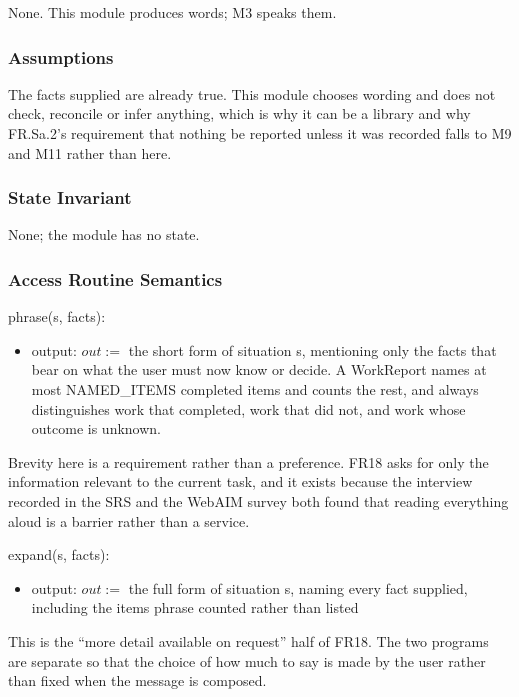 \documentclass[12pt, titlepage]{article}
\begin{document}
None. This module produces words; M3 speaks them.

\subsubsection{Assumptions}

The facts supplied are already true. This module chooses wording and does not
check, reconcile or infer anything, which is why it can be a library and why
FR.Sa.2's requirement that nothing be reported unless it was recorded falls to
M9 and M11 rather than here.

\subsubsection{State Invariant}

None; the module has no state.

\subsubsection{Access Routine Semantics}

\noindent phrase(s, facts):
\begin{itemize}
\item output: $out :=$ the short form of situation s, mentioning only the facts
that bear on what the user must now know or decide. A WorkReport names at most
NAMED\_ITEMS completed items and counts the rest, and always distinguishes work
that completed, work that did not, and work whose outcome is unknown.
\end{itemize}

\noindent Brevity here is a requirement rather than a preference. FR18 asks for
only the information relevant to the current task, and it exists because the
interview recorded in the SRS and the WebAIM survey both found that reading
everything aloud is a barrier rather than a service.

\noindent expand(s, facts):
\begin{itemize}
\item output: $out :=$ the full form of situation s, naming every fact supplied,
including the items phrase counted rather than listed
\end{itemize}

\noindent This is the ``more detail available on request'' half of FR18. The two
programs are separate so that the choice of how much to say is made by the user
rather than fixed when the message is composed.
\end{document}

